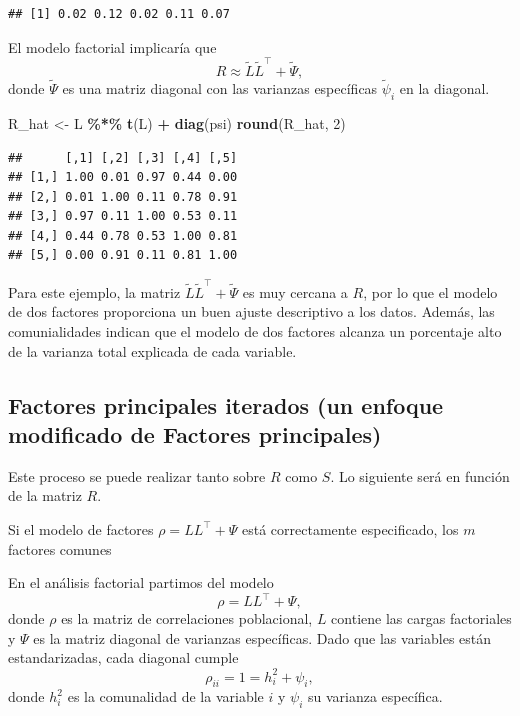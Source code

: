 \documentclass[
]{book}
\newenvironment{Shaded}{\begin{snugshade}}{\end{snugshade}}
\newcommand{\DecValTok}[1]{\textcolor[rgb]{0.00,0.00,0.81}{#1}}
\newcommand{\FunctionTok}[1]{\textcolor[rgb]{0.13,0.29,0.53}{\textbf{#1}}}
\newcommand{\NormalTok}[1]{#1}
\newcommand{\OtherTok}[1]{\textcolor[rgb]{0.56,0.35,0.01}{#1}}
\newcommand{\SpecialCharTok}[1]{\textcolor[rgb]{0.81,0.36,0.00}{\textbf{#1}}}
\begin{document}
\begin{verbatim}
## [1] 0.02 0.12 0.02 0.11 0.07
\end{verbatim}

El modelo factorial implicaría que
\[
R \approx \tilde{L}\tilde{L}^{\top} + \tilde{\Psi},
\]
donde \(\tilde{\Psi}\) es una matriz diagonal con las varianzas específicas \(\tilde{\psi}_i\) en la diagonal.

\begin{Shaded}
\begin{Highlighting}[]
\NormalTok{R\_hat }\OtherTok{\textless{}{-}}\NormalTok{ L }\SpecialCharTok{\%*\%} \FunctionTok{t}\NormalTok{(L) }\SpecialCharTok{+} \FunctionTok{diag}\NormalTok{(psi)}
\FunctionTok{round}\NormalTok{(R\_hat, }\DecValTok{2}\NormalTok{)}
\end{Highlighting}
\end{Shaded}

\begin{verbatim}
##      [,1] [,2] [,3] [,4] [,5]
## [1,] 1.00 0.01 0.97 0.44 0.00
## [2,] 0.01 1.00 0.11 0.78 0.91
## [3,] 0.97 0.11 1.00 0.53 0.11
## [4,] 0.44 0.78 0.53 1.00 0.81
## [5,] 0.00 0.91 0.11 0.81 1.00
\end{verbatim}

Para este ejemplo, la matriz \(\tilde{L}\tilde{L}^{\top} + \tilde{\Psi}\) es muy cercana a \(R\), por lo que el modelo de dos factores proporciona un buen ajuste descriptivo a los datos. Además, las comunialidades indican que el modelo de dos factores alcanza un porcentaje alto de la varianza total explicada de cada variable.

\subsection{Factores principales iterados (un enfoque modificado de Factores principales)}\label{factores-principales-iterados-un-enfoque-modificado-de-factores-principales}

Este proceso se puede realizar tanto sobre \(R\) como \(S\). Lo siguiente será en función de la matriz \(R\).

Si el modelo de factores \(\rho = LL^\top + \Psi\) está correctamente especificado, los \(m\) factores comunes

En el análisis factorial partimos del modelo
\[
\rho = LL^{\top} + \Psi,
\]
donde \(\rho\) es la matriz de correlaciones poblacional, \(L\) contiene las cargas
factoriales y \(\Psi\) es la matriz diagonal de varianzas específicas. Dado que las
variables están estandarizadas, cada diagonal cumple
\[
\rho_{ii} = 1 = h_i^2 + \psi_i,
\]
donde \(h_i^2\) es la comunalidad de la variable \(i\) y \(\psi_i\) su varianza
específica.
\end{document}

